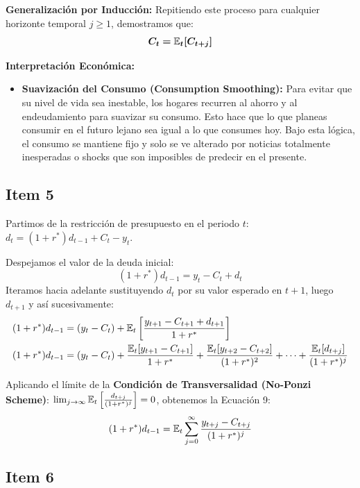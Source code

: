 \textbf{Generalización por Inducción:}
Repitiendo este proceso para cualquier horizonte temporal $j \geq 1$, demostramos que:
\begin{equation}
    \bm{C_t = \mathbb{E}_t[C_{t+j}]}
\end{equation}

\textbf{Interpretación Económica:}
\begin{itemize}
    \item \textbf{Suavización del Consumo (Consumption Smoothing):} Para evitar que su nivel de vida sea inestable, los hogares recurren al ahorro y al endeudamiento para suavizar su consumo. Esto hace que lo que planeas consumir en el futuro lejano sea igual a lo que consumes hoy. Bajo esta lógica, el consumo se mantiene fijo y solo se ve alterado por noticias totalmente inesperadas o shocks que son imposibles de predecir en el presente.
\end{itemize}

\subsection*{Item 5}

Partimos de la restricción de presupuesto en el periodo $t$: $d_t = (1+r^*)d_{t-1} + C_t - y_t$. 

Despejamos el valor de la deuda inicial:
\begin{equation}
    (1+r^*)d_{t-1} = y_t - C_t + d_t
\end{equation}
Iteramos hacia adelante sustituyendo $d_t$ por su valor esperado en $t+1$, luego $d_{t+1}$ y así sucesivamente:
\begin{align}
    (1+r^*)d_{t-1} &= (y_t - C_t) + \mathbb{E}_t \left[ \frac{y_{t+1} - C_{t+1} + d_{t+1}}{1+r^*} \right] \\
    (1+r^*)d_{t-1} &= (y_t - C_t) + \frac{\mathbb{E}_t[y_{t+1} - C_{t+1}]}{1+r^*} + \frac{\mathbb{E}_t[y_{t+2} - C_{t+2}]}{(1+r^*)^2} + \dots + \frac{\mathbb{E}_t[d_{t+j}]}{(1+r^*)^j}
\end{align}

Aplicando el límite de la \textbf{Condición de Transversalidad (No-Ponzi Scheme)}: $\lim_{j \to \infty} \mathbb{E}_t \left[ \frac{d_{t+j}}{(1+r^*)^j} \right] = 0$, obtenemos la Ecuación 9:
\begin{equation}
    (1+r^*)d_{t-1} = \mathbb{E}_t \sum_{j=0}^{\infty} \frac{y_{t+j} - C_{t+j}}{(1+r^*)^j}
\end{equation}

\subsection*{Item 6}


